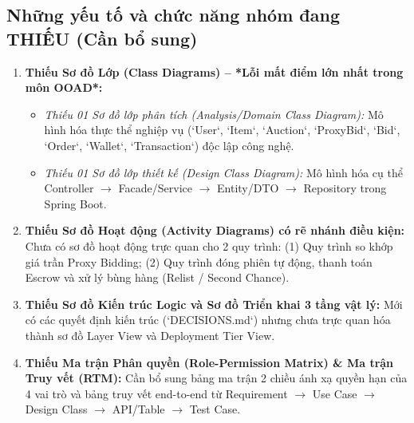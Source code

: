 \documentclass[11pt,a4paper]{article}
\begin{document}
\subsection{Những yếu tố và chức năng nhóm đang THIẾU (Cần bổ sung)}
\begin{enumerate}[leftmargin=*]
    \item \textbf{Thiếu Sơ đồ Lớp (Class Diagrams) -- *Lỗi mất điểm lớn nhất trong môn OOAD*:}
    \begin{itemize}
        \item \textit{Thiếu 01 Sơ đồ lớp phân tích (Analysis/Domain Class Diagram):} Mô hình hóa thực thể nghiệp vụ (`User`, `Item`, `Auction`, `ProxyBid`, `Bid`, `Order`, `Wallet`, `Transaction`) độc lập công nghệ.
        \item \textit{Thiếu 01 Sơ đồ lớp thiết kế (Design Class Diagram):} Mô hình hóa cụ thể Controller $\rightarrow$ Facade/Service $\rightarrow$ Entity/DTO $\rightarrow$ Repository trong Spring Boot.
    \end{itemize}
    \item \textbf{Thiếu Sơ đồ Hoạt động (Activity Diagrams) có rẽ nhánh điều kiện:}
    Chưa có sơ đồ hoạt động trực quan cho 2 quy trình: (1) Quy trình so khớp giá trần Proxy Bidding; (2) Quy trình đóng phiên tự động, thanh toán Escrow và xử lý bùng hàng (Relist / Second Chance).
    \item \textbf{Thiếu Sơ đồ Kiến trúc Logic và Sơ đồ Triển khai 3 tầng vật lý:}
    Mới có các quyết định kiến trúc (`DECISIONS.md`) nhưng chưa trực quan hóa thành sơ đồ Layer View và Deployment Tier View.
    \item \textbf{Thiếu Ma trận Phân quyền (Role-Permission Matrix) \& Ma trận Truy vết (RTM):}
    Cần bổ sung bảng ma trận 2 chiều ánh xạ quyền hạn của 4 vai trò và bảng truy vết end-to-end từ Requirement $\rightarrow$ Use Case $\rightarrow$ Design Class $\rightarrow$ API/Table $\rightarrow$ Test Case.
\end{enumerate}
\end{document}
